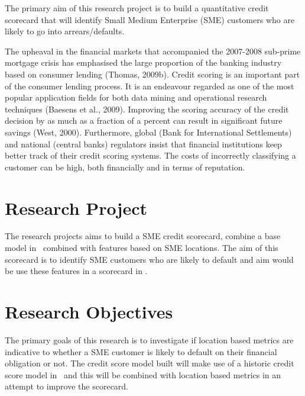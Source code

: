 The primary aim of this research project is to build a quantitative credit scorecard that will identify Small Medium Enterprise (SME) customers who are likely to go into arrears/defaults.


The upheaval in the financial markets that accompanied the 2007-2008 sub-prime
mortgage crisis has emphasised the large proportion of the banking industry based
on consumer lending (Thomas, 2009b). Credit scoring is an important part of the
consumer lending process. It is an endeavour regarded as one of the most popular
application fields for both data mining and operational research techniques (Baesens
et al., 2009). Improving the scoring accuracy of the credit decision by as much as
a fraction of a percent can result in significant future savings (West, 2000). Furthermore,
global (Bank for International Settlements) and national (central banks)
regulators insist that financial institutions keep better track of their credit scoring
systems. The costs of incorrectly classifying a customer can be high, both financially
and in terms of reputation.


\section{Research Project}
The research projects aims to build a SME credit scorecard, combine a base model in \subjectname\ combined with features based on SME locations. The aim of this scorecard is to identify SME customers who are likely to default and aim would be use these features in a scorecard in \subjectname.



\section{Research Objectives}
The primary goals of this research is to investigate if location based metrics are indicative to whether a SME customer is likely to default on their financial obligation or not. The credit score model built will make use of a historic credit score model in \subjectname\ and this will be combined with location based metrics in an attempt to improve the scorecard. 
 
